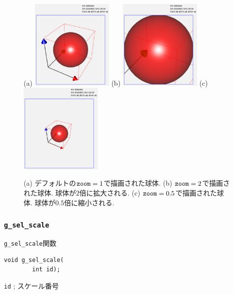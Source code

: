 \documentclass[platex,a4paper,12pt]{jsarticle}%
\begin{document}
\begin{figure}[htb]
\centering
(a)
\includegraphics[width=40mm]{g_vision_zoom_01.eps}
(b)
\includegraphics[width=40mm]{g_vision_zoom_02.eps}
(c)
\includegraphics[width=40mm]{g_vision_zoom_03.eps}

\begin{flushleft}
(a) デフォルトの$\verb|zoom|=1$で描画された球体.
(b) $\verb|zoom|=2$で描画された球体. 球体が$2$倍に拡大される.
(c) $\verb|zoom|=0.5$で描画された球体. 球体が$0.5$倍に縮小される.
\end{flushleft}
\end{figure}



\clearpage
\subsubsection{\texttt{g\_sel\_scale}}

\begin{itembox}[l]{\texttt{g\_sel\_scale}関数}
\begin{verbatim}
void g_sel_scale(
        int id);
\end{verbatim}
\verb|id| ; スケール番号
\end{itembox}
\end{document}
